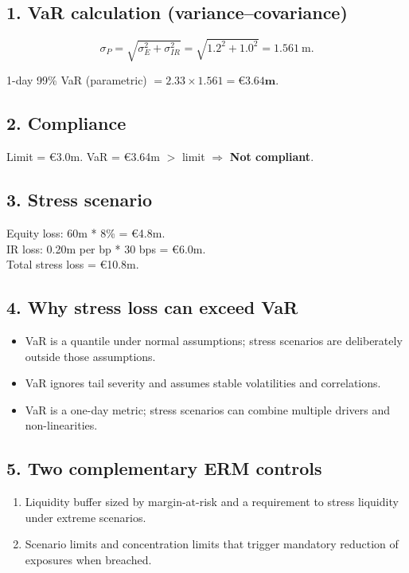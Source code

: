 \documentclass[11pt]{article}
\begin{document}
\subsection*{1. VaR calculation (variance--covariance)}


\[
\sigma_P = \sqrt{\sigma_E^2 + \sigma_{IR}^2} = \sqrt{1.2^2 + 1.0^2} = 1.561\ \text{m}.
\]


1-day 99\% VaR (parametric) \(= 2.33 \times 1.561 = \mathbf{\euro 3.64m}\).

\subsection*{2. Compliance}
Limit = \euro 3.0m. VaR = \euro 3.64m $>$ limit $\Rightarrow$ \textbf{Not compliant}.

\subsection*{3. Stress scenario}
Equity loss: 60m * 8\% = \euro 4.8m. \\
IR loss: 0.20m per bp * 30 bps = \euro 6.0m. \\
Total stress loss = \euro 10.8m.

\subsection*{4. Why stress loss can exceed VaR}
\begin{itemize}
  \item VaR is a quantile under normal assumptions; stress scenarios are deliberately outside those assumptions.
  \item VaR ignores tail severity and assumes stable volatilities and correlations.
  \item VaR is a one-day metric; stress scenarios can combine multiple drivers and non-linearities.
\end{itemize}

\subsection*{5. Two complementary ERM controls}
\begin{enumerate}
  \item Liquidity buffer sized by margin-at-risk and a requirement to stress liquidity under extreme scenarios.
  \item Scenario limits and concentration limits that trigger mandatory reduction of exposures when breached.
\end{enumerate}
\end{document}
